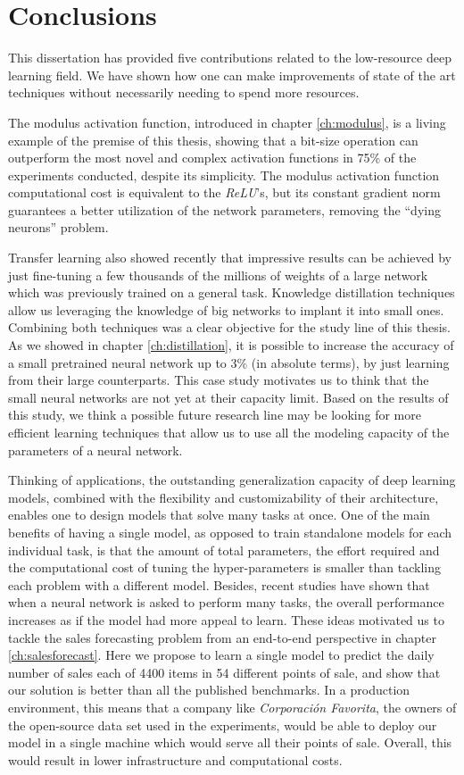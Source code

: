 \chapter{Conclusions} \label{ch:conclusions}
This dissertation has provided five contributions related to the low-resource deep learning field. We have shown how one can make improvements of state of the art techniques without necessarily needing to spend more resources. 

The modulus activation function, introduced in chapter \ref{ch:modulus}, is a living example of the premise of this thesis, showing that a bit-size operation can outperform the most novel and complex activation functions in 75\% of the experiments conducted, despite its simplicity. The modulus activation function computational cost is equivalent to the \textit{ReLU}'s, but its constant gradient norm guarantees a better utilization of the network parameters, removing the ``dying neurons'' problem. 

Transfer learning also showed recently that impressive results can be achieved by just fine-tuning a few thousands of the millions of weights of a large network which was previously trained on a general task. Knowledge distillation techniques allow us leveraging the knowledge of big networks to implant it into small ones. Combining both techniques was a clear objective for the study line of this thesis. As we showed in chapter \ref{ch:distillation}, it is possible to increase the accuracy of a small pretrained neural network up to 3\% (in absolute terms), by just learning from their large counterparts. This case study motivates us to think that the small neural networks are not yet at their capacity limit. Based on the results of this study, we think a possible future research line may be looking for more efficient learning techniques that allow us to use all the modeling capacity of the parameters of a neural network.

Thinking of applications, the outstanding generalization capacity of deep learning models, combined with the flexibility and customizability of their architecture, enables one to design models that solve many tasks at once. One of the main benefits of having a single model, as opposed to train standalone models for each individual task, is that the amount of total parameters, the effort required and the computational cost of tuning the hyper-parameters is smaller than tackling each problem with a different model. Besides, recent studies have shown that when a neural network is asked to perform many tasks, the overall performance increases as if the model had more appeal to learn. These ideas motivated us to tackle the sales forecasting problem from an end-to-end perspective in chapter \ref{ch:salesforecast}. Here we propose to learn a single model to predict the daily number of sales each of 4400 items in 54 different points of sale, and show that our solution is better than all the published benchmarks. In a production environment, this means that a company like \textit{Corporación Favorita}, the owners of the open-source data set used in the experiments, would be able to deploy our model in a single machine which would serve all their points of sale. Overall, this would result in lower infrastructure and computational costs.

